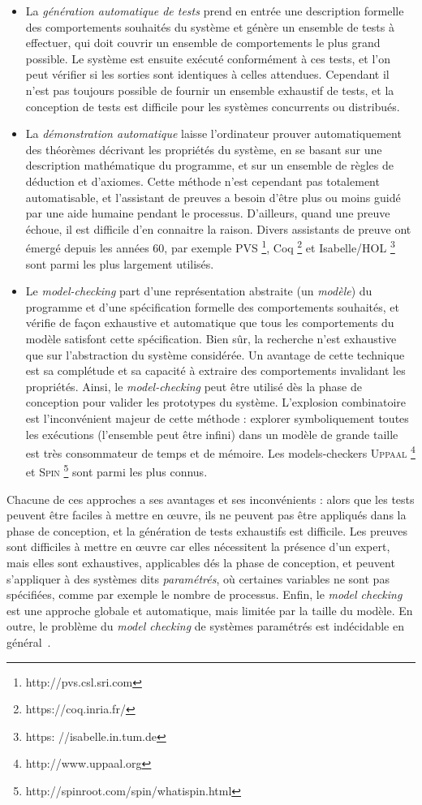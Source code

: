 \begin{itemize}
\item La \emph{génération automatique de tests} prend en entrée
  une description formelle des comportements souhaités du système et
  génère un ensemble de tests à effectuer, qui doit couvrir un
  ensemble de comportements le plus grand possible. Le système est
  ensuite exécuté conformément à ces tests, et l'on peut vérifier si
  les sorties sont identiques à celles attendues.  Cependant il n’est
  pas toujours possible de fournir un ensemble exhaustif de tests, et
  la conception de tests est difficile pour les systèmes concurrents
  ou distribués.
%
\item La \emph{démonstration automatique} laisse l’ordinateur prouver
  automatiquement des théorèmes décrivant les propriétés du système,
  en se basant sur une description mathématique du programme, et sur
  un ensemble de règles de déduction et d’axiomes.  Cette méthode
  n’est cependant pas totalement automatisable, et l’assistant de
  preuves a besoin d’être plus ou moins guidé par une aide humaine
  pendant le processus. D'ailleurs, quand une preuve échoue, il est
  difficile d'en connaitre la raison. Divers assistants de preuve ont
  émergé depuis les années 60, par exemple PVS
  \footnote{http://pvs.csl.sri.com}, Coq
  \footnote{https://coq.inria.fr/} et Isabelle/HOL \footnote{https:
    //isabelle.in.tum.de} sont parmi les plus largement utilisés.
\item Le \emph{model-checking} part d’une représentation abstraite (un
  \emph{modèle}) du programme et d’une spécification formelle des
  comportements souhaités, et vérifie de façon exhaustive et
  automatique que tous les comportements du modèle satisfont cette
  spécification. Bien sûr, la recherche n’est exhaustive que sur
  l’abstraction du système considérée.  Un avantage de cette technique
  est sa complétude et sa capacité à extraire des comportements
  invalidant les propriétés. Ainsi, le \emph{model-checking} peut être
  utilisé dès la phase de conception pour valider les prototypes du
  système. L'explosion combinatoire est l'inconvénient majeur de cette
  méthode : explorer symboliquement toutes les exécutions (l'ensemble
  peut être infini) dans un modèle de grande taille est très
  consommateur de temps et de mémoire. Les
  models-checkers \textsc{Uppaal} \footnote{http://www.uppaal.org} et
  \textsc{Spin} \footnote{http://spinroot.com/spin/whatispin.html}
  sont parmi les plus connus.
\end{itemize}
Chacune de ces approches a ses avantages et ses inconvénients : alors
que les tests peuvent être faciles à mettre en œuvre, ils ne peuvent
pas être appliqués dans la phase de conception, et la génération de
tests exhaustifs est difficile.  Les preuves sont difficiles à mettre
en œuvre car elles nécessitent la présence d'un expert, mais elles
sont exhaustives, applicables dés la phase de conception, et peuvent
s'appliquer à des systèmes dits \emph{paramétrés}, où certaines
variables ne sont pas spécifiées, comme par exemple le nombre de
processus. Enfin, le \emph{model checking} est une approche globale et
automatique, mais limitée par la taille du modèle.  En outre, le
problème du \emph{model checking} de systèmes paramétrés est
indécidable en général~\cite{apt.kozen.86}.

